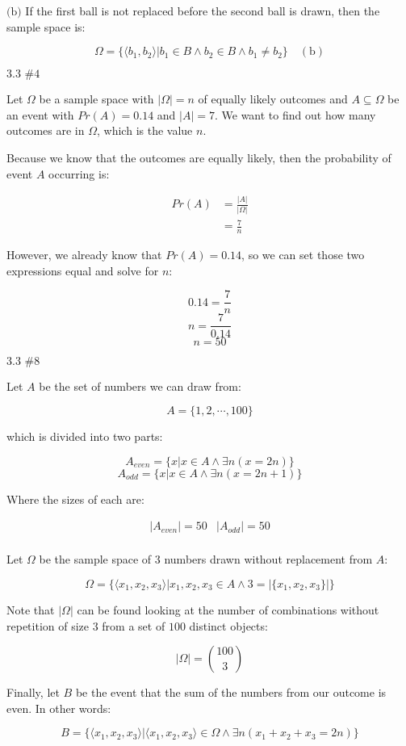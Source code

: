 \documentclass{article}
\newcommand{\problem}[2]{$\boxed{\text{#1 \##2}}$}
\newcommand{\subproblem}[1]{$\boxed{\text{(#1)}}$}
\newcommand{\subsolution}[2]{\boxed{#2\quad(\text{#1})}}
\newcommand{\solution}[1]{\boxed{#1}}
\newcommand{\multistep}[1]{\begin{array}{rl} #1 \end{array}}
\begin{document}
\begin{multicols*}{2}
%
\subproblem{b} If the first ball is not replaced before the second
ball is drawn, then the sample space is:

\[
\subsolution{b}{\Omega = \{\langle b_1,b_2\rangle|b_1\in B\wedge b_2\in B\wedge b_1\ne b_2\}}
\]

%
\problem{3.3}{4}

Let $\Omega$ be a sample space with $|\Omega|=n$ of equally likely
outcomes and $A\subseteq\Omega$ be an event with $Pr(A)=0.14$ and
$|A|=7$. We want to find out how many outcomes are in $\Omega$, which
is the value $n$.

Because we know that the outcomes are equally likely, then the
probability of event $A$ occurring is:

\[
\multistep{
Pr(A)&=\frac{|A|}{|\Omega|} \\
&=\frac{7}{n}
}
\]

However, we already know that $Pr(A)=0.14$, so we can set those two
expressions equal and solve for $n$:

\[
0.14=\frac{7}{n}
\] \[
n=\frac{7}{0.14}
\] \[
\solution{n=50}
\]

%
\problem{3.3}{8}

Let $A$ be the set of numbers we can draw from:

\[
A=\{1,2,\cdots,100\}
\]

which is divided into two parts:

\[
A_{even}=\{x|x\in A\wedge\exists n(x=2n)\}
\] \[
A_{odd}=\{x|x\in A\wedge\exists n(x=2n+1)\}
\]

Where the sizes of each are:

\[
\begin{array}{cc}
|A_{even}|=50 & |A_{odd}|=50 \\
\end{array}
\]

Let $\Omega$ be the sample space of 3 numbers drawn without
replacement from $A$:

\[
\Omega=\{\langle x_1,x_2,x_3\rangle|x_1,x_2,x_3\in A\wedge 3=|\{x_1,x_2,x_3\}|\}
\]

Note that $|\Omega|$ can be found looking at the number of
combinations without repetition of size $3$ from a set of $100$
distinct objects:

\[
|\Omega|=\binom{100}{3}
\]

Finally, let $B$ be the event that the sum of the numbers from our
outcome is even. In other words:

\[
B=\{\langle x_1,x_2,x_3\rangle|\langle x_1,x_2,x_3\rangle\in\Omega\wedge \exists n(x_1+x_2+x_3=2n)\}
\]


\end{multicols*}
\end{document}
